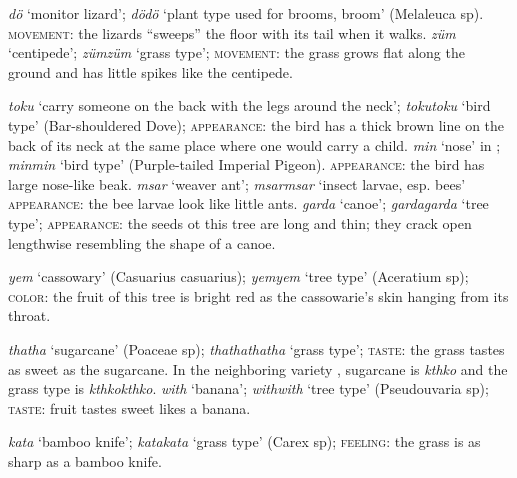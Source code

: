 \begin{exe}
\ex \label{ex613}
\begin{xlist}
	\ex	\label{ex614} \emph{dö} `monitor lizard'; \emph{dödö} `plant type used for brooms, broom' (Melaleuca sp). \textsc{movement:} the lizards ``sweeps'' the floor with its tail when it walks.
	\ex \label{ex615} \emph{züm} `centipede'; \emph{zümzüm} `grass type'; \textsc{movement:} the grass grows flat along the ground and has little spikes like the centipede.
\end{xlist}
\end{exe}%
\begin{exe}
\ex \label{ex616}
\begin{xlist}
	\ex \label{ex617} \emph{toku} `carry someone on the back with the legs around the neck'; \emph{tokutoku} `bird type' (Bar-shouldered Dove); \textsc{appearance:} the bird has a thick brown line on the back of its neck at the same place where one would carry a child.
	\ex \label{ex618} \emph{min} `nose' in ; \emph{minmin} `bird type' (Purple-tailed Imperial Pigeon). \textsc{appearance:} the bird has large nose-like beak.
	\ex \label{ex619} \emph{msar} `weaver ant'; \emph{msarmsar} `insect larvae, esp. bees' \textsc{appearance:} the bee larvae look like little ants.
	\ex \label{ex620} \emph{garda} `canoe'; \emph{gardagarda} `tree type'; \textsc{appearance:} the seeds ot this tree are long and thin; they crack open lengthwise resembling the shape of a canoe.
\end{xlist}
\end{exe}%
\begin{exe}
	\ex \label{ex622} \emph{yem} `cassowary' (Casuarius casuarius); \emph{yemyem} `tree type' (Aceratium sp); \textsc{color:} the fruit of this tree is bright red as the cassowarie's skin hanging from its throat.
\end{exe}%
\begin{exe}
\ex  \label{ex623}
\begin{xlist}
	\ex \label{ex624} \emph{thatha} `sugarcane' (Poaceae sp); \emph{thathathatha} `grass type'; \textsc{taste:} the grass tastes as sweet as the sugarcane. In the neighboring variety , sugarcane is \emph{kthko} and the grass type is \emph{kthkokthko}.
	\ex \label{ex625} \emph{with} `banana'; \emph{withwith} `tree type' (Pseudouvaria sp); \textsc{taste:} fruit tastes sweet likes a banana.
\end{xlist}
\end{exe}%
\begin{exe}
	\ex \label{ex627} \emph{kata} `bamboo knife'; \emph{katakata} `grass type' (Carex sp); \textsc{feeling:} the grass is as sharp as a bamboo knife.
\end{exe}%
